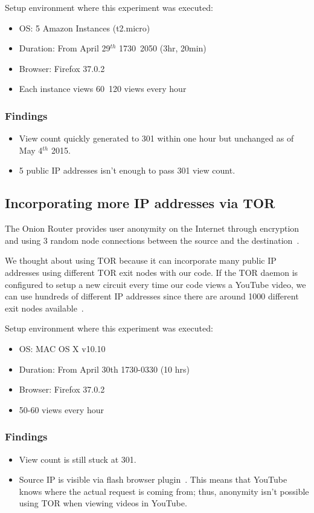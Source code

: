\documentclass[conference]{IEEEtran}
\begin{document}
Setup environment where this experiment was executed:
\begin{itemize}
  \setlength\itemsep{-0.1em}
  \item OS: 5 Amazon Instances (t2.micro)
  \item Duration: From April 29$^{th}$ 1730~2050 (3hr, 20min)
  \item Browser: Firefox 37.0.2
  \item Each instance views 60~120 views every hour
\end{itemize}

\subsubsection*{Findings}
\begin{itemize}
  \setlength\itemsep{-0.1em}
  \item View count quickly generated to 301 within one hour but unchanged as of May 4$^{th}$ 2015.
  \item 5 public IP addresses isn’t enough to pass 301 view count.
\end{itemize}


\subsection{Incorporating more IP addresses via TOR}

The Onion Router provides user anonymity on the Internet through encryption and using 3 random node connections between the source and the destination~\cite{c14}.

We thought about using TOR because it can incorporate many public IP addresses using different TOR exit nodes with our code. If the TOR daemon is configured to setup a new circuit every time our code views a YouTube video, we can use hundreds of different IP addresses since there are around 1000 different exit nodes available~\cite{c15}.

Setup environment where this experiment was executed:
\begin{itemize}
  \setlength\itemsep{-0.1em}
  \item OS: MAC OS X v10.10
  \item Duration: From April 30th 1730-0330 (10 hrs)
  \item Browser: Firefox 37.0.2
  \item 50-60 views every hour
\end{itemize}

\subsubsection*{Findings}
\begin{itemize}
  \setlength\itemsep{-0.1em}
  \item View count is still stuck at 301.
  \item Source IP is visible via flash browser plugin~\cite{c14}. This means that YouTube knows where the actual request is coming from; thus, anonymity isn’t possible using TOR when viewing videos in YouTube.
\end{itemize}
\end{document}
